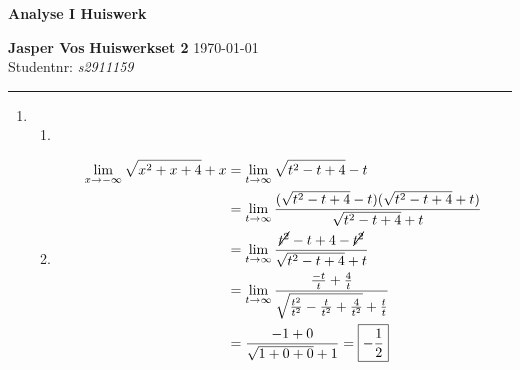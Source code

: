 \documentclass{article}
\begin{document}
{\Large \textbf{Analyse I Huiswerk}}

\bigskip

\textbf{Jasper Vos} \hfill \textbf{Huiswerkset 2} \hfill \today \\
Studentnr: \emph{s2911159} 

\rule{\textwidth}{2pt}

\bigskip

\begin{enumerate}
    \item
    \begin{enumerate}[label=\alph*)]
        \item
        \item
            \begin{align*}
                \lim_{x \rightarrow -\infty} \sqrt{x^2+x+4} + x &= \lim_{t \rightarrow \infty} \sqrt{t^2-t+4}-t \\
                &= \lim_{t \rightarrow \infty} \frac{(\sqrt{t^2-t+4}-t)(\sqrt{t^2-t+4}+t)}{\sqrt{t^2-t+4}+t} \\
                &= \lim_{t \rightarrow \infty} \frac{\cancel{t^2}-t+4-\cancel{t^2}}{\sqrt{t^2-t+4}+t} \\
                &= \lim_{t \rightarrow \infty} \frac{\frac{-t}{t}+\frac{4}{t}}{\sqrt{\frac{t^2}{t^2}-\frac{t}{t^2}+\frac{4}{t^2}} + \frac{t}{t}} \\
                &= \frac{-1 + 0}{\sqrt{1+0+0}+1} = \boxed{-\frac{1}{2}}
            \end{align*}
        
    \end{enumerate}
\end{enumerate}
\end{document}
